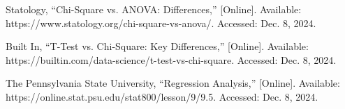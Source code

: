 \documentclass[conference]{IEEEtran}
\begin{document}
\begin{thebibliography}{00}
 Statology, ``Chi-Square vs. ANOVA: Differences,'' [Online]. Available: https://www.statology.org/chi-square-vs-anova/. Accessed: Dec. 8, 2024.

 Built In, ``T-Test vs. Chi-Square: Key Differences,'' [Online]. Available: https://builtin.com/data-science/t-test-vs-chi-square. Accessed: Dec. 8, 2024.

 The Pennsylvania State University, ``Regression Analysis,'' [Online]. Available: https://online.stat.psu.edu/stat800/lesson/9/9.5. Accessed: Dec. 8, 2024.


\end{thebibliography}
\end{document}
